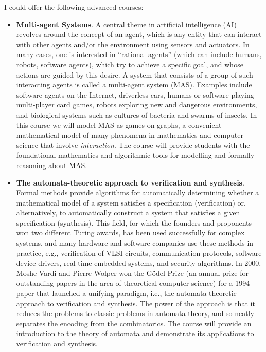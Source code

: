 \documentclass[10,a4paper,sans]{moderncv}
\begin{document}
I could offer the following advanced courses: 
\begin{itemize}
\item \textbf{Multi-agent Systems}. A central theme in artificial intelligence (AI) revolves around the concept of an agent,
which is any entity that can interact with other agents and/or the environment using sensors 
and actuators. In many cases, one is interested in ``rational agents'' (which can
include humans, robots, software agents), which try to achieve a specific goal, and whose
actions are guided by this desire. A system that consists of a group of such interacting
agents is called a multi-agent system (MAS). Examples include software agents on
the Internet, driverless cars, humans or software playing multi-player card games, robots
exploring new and dangerous environments, and biological systems such as cultures of
bacteria and swarms of insects. In this course we will model MAS as games on graphs, 
a convenient mathematical model of many phenomena in mathematics and computer science that involve \emph{interaction}.
The course will provide students with the foundational mathematics and algorithmic tools for modelling and formally 
reasoning about MAS. 

\item \textbf{The automata-theoretic approach to verification and synthesis}.  Formal methods provide algorithms 
for automatically determining whether a mathematical model of a system satisfies a specification (verification)
or, alternatively, to automatically construct a system that satisfies a given specification (synthesis). 
This field, for which the founders and proponents won two different Turing awards, has been used successfully for
complex systems, and many hardware and software companies use these methods in practice, 
e.g., verification of VLSI circuits, communication protocols, software device drivers, real-time embedded systems, and security algorithms.
In 2000, Moshe Vardi and Pierre Wolper won the G\"odel Prize (an annual prize for outstanding papers in the area of theoretical computer science) for 
a 1994 paper that launched a unifying paradigm, i.e., the automata-theoretic approach to verification and synthesis. 
The power of the approach is that it reduces the problems to classic problems in automata-theory, and so neatly separates the encoding from the combinatorics. 
The course will provide an introduction to the theory of automata and demonstrate its applications to verification and synthesis. 
\end{itemize}
\end{document}
